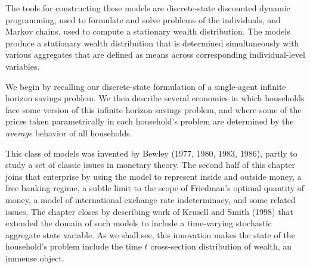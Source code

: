 The tools for constructing these models are discrete-state
discounted dynamic programming, used to formulate and solve
problems of the individuals, and Markov chains, used to
compute a stationary wealth distribution. The models produce
a stationary wealth distribution that is determined
simultaneously with various aggregates that are defined
as means across corresponding individual-level variables.

\newpage

We begin by recalling our discrete-state formulation of a
single-agent infinite horizon savings problem. We then describe
several economies in which  households face some version of
this infinite horizon savings problem, and where some of the
prices taken parametrically in each household's problem
are determined by the {\it average\/} behavior of
all households.%

   This class of models was invented by Bewley (1977, 1980, 1983, 1986),
partly to study a set of classic issues in monetary theory.
The second half of this chapter joins that enterprise by using
the model to represent inside and outside money, a free banking
regime, a subtle limit to the scope of Friedman's optimal quantity
of money, a model of international exchange rate indeterminacy,
and some related issues.  The chapter closes by describing work of Krusell and Smith (1998) that extended the domain
of such models to include a time-varying stochastic aggregate state
variable.  As we shall see, this innovation makes the state
of the household's problem include the time $t$ cross-section
distribution of wealth, an immense object.

